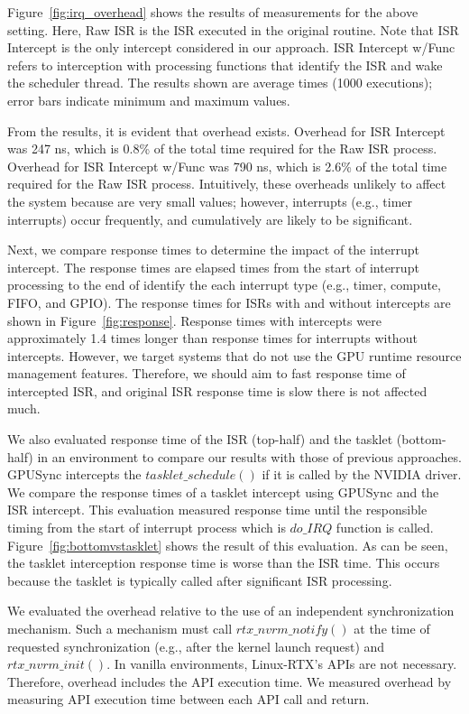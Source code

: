 Figure~\ref{fig:irq_overhead} shows the results of measurements for the above setting.
Here, Raw ISR is the ISR executed in the original routine.
Note that ISR Intercept is the only intercept considered in our approach.
ISR Intercept w/Func refers to interception with processing functions that identify the ISR and wake the scheduler thread.
The results shown are average times (1000 executions); error bars indicate minimum and maximum values.

From the results, it is evident that overhead exists.
Overhead for ISR Intercept was 247 ns, which is 0.8\% of the total time required for the Raw ISR process.
Overhead for ISR Intercept w/Func was 790 ns, which is 2.6\% of the total time required for the Raw ISR process.
Intuitively, these overheads unlikely to affect the system because are very small values;
however, interrupts (e.g., timer interrupts) occur frequently, and cumulatively are likely to be significant.

Next, we compare response times to determine the impact of the interrupt intercept.
The response times are elapsed times from the start of interrupt processing to the end of identify the each interrupt type (e.g., timer, compute, FIFO, and GPIO).
The response times for ISRs with and without intercepts are shown in Figure~\ref{fig:response}.
Response times with intercepts were approximately 1.4 times longer than response times for interrupts without intercepts.
However, we target systems that do not use the GPU runtime resource management features.
Therefore, we should aim to fast response time of intercepted ISR, and original ISR response time is slow there is not affected much.

We also evaluated response time of the ISR (top-half) and the tasklet (bottom-half) in an environment to compare our results with those of previous approaches.
GPUSync intercepts the $tasklet\_schedule()$ if it is called by the NVIDIA driver.
We compare the response times of a tasklet intercept using GPUSync and the ISR intercept.
This evaluation measured response time until the responsible timing from the start of interrupt process which is $do\_IRQ$ function is called.
Figure~\ref{fig:bottomvstasklet} shows the result of this evaluation.
As can be seen, the tasklet interception response time is worse than the ISR time.
This occurs because the tasklet is typically called after significant ISR processing.

We evaluated the overhead relative to the use of an independent synchronization mechanism.
Such a mechanism must call $rtx\_nvrm\_notify()$ at the time of requested synchronization (e.g., after the kernel launch request) and $rtx\_nvrm\_init()$.
In vanilla environments, Linux-RTX's APIs are not necessary.
Therefore, overhead includes the API execution time.
We measured overhead by measuring API execution time between each API call and return.

